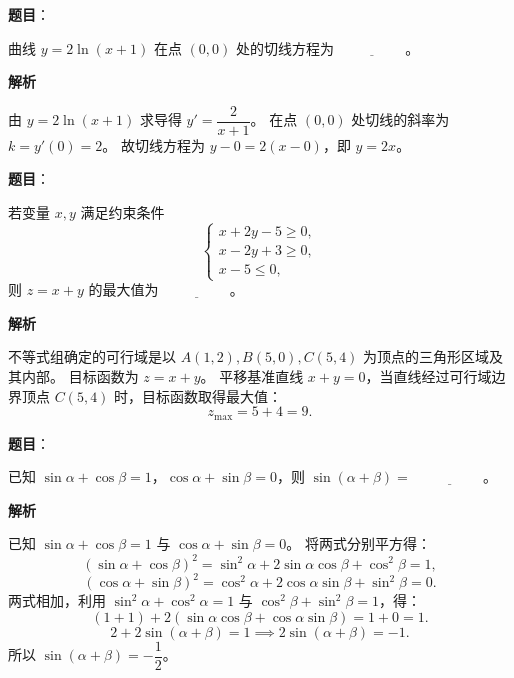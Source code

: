 \begin{answer}

\textbf{题目}：

曲线 $y=2\ln(x+1)$ 在点 $(0,0)$ 处的切线方程为 $\underline{\hspace{2cm}}$。

\textbf{解析}

由 $y=2\ln(x+1)$ 求导得 $y' = \dfrac{2}{x+1}$。
在点 $(0,0)$ 处切线的斜率为 $k = y'(0) = 2$。
故切线方程为 $y - 0 = 2(x - 0)$，即 $y = 2x$。


\end{answer}
\begin{answer}

\textbf{题目}：

若变量 $x, y$ 满足约束条件
\nopagebreak[4]
\[\begin{cases} x+2y-5\geqslant 0, \\ x-2y+3\geqslant 0, \\ x-5\leqslant 0, \end{cases}\]
则 $z=x+y$ 的最大值为 $\underline{\hspace{2cm}}$。

\textbf{解析}

不等式组确定的可行域是以 $A(1,2), B(5,0), C(5,4)$ 为顶点的三角形区域及其内部。
目标函数为 $z=x+y$。
平移基准直线 $x+y=0$，当直线经过可行域边界顶点 $C(5,4)$ 时，目标函数取得最大值：
\nopagebreak[4]
\[z_{\max} = 5 + 4 = 9.\]


\end{answer}
\begin{answer}

\textbf{题目}：

已知 $\sin\alpha+\cos\beta=1$，$\cos\alpha+\sin\beta=0$，则 $\sin(\alpha+\beta)=$ $\underline{\hspace{2cm}}$。

\textbf{解析}

已知 $\sin\alpha+\cos\beta=1$ 与 $\cos\alpha+\sin\beta=0$。
将两式分别平方得：
\nopagebreak[4]
\[(\sin\alpha+\cos\beta)^2 = \sin^2\alpha + 2\sin\alpha\cos\beta + \cos^2\beta = 1,\]
\nopagebreak[4]
\[(\cos\alpha+\sin\beta)^2 = \cos^2\alpha + 2\cos\alpha\sin\beta + \sin^2\beta = 0.\]
两式相加，利用 $\sin^2\alpha+\cos^2\alpha=1$ 与 $\cos^2\beta+\sin^2\beta=1$，得：
\nopagebreak[4]
\[(1+1) + 2(\sin\alpha\cos\beta+\cos\alpha\sin\beta) = 1+0 = 1.\]
\nopagebreak[4]
\[2 + 2\sin(\alpha+\beta) = 1 \implies 2\sin(\alpha+\beta) = -1.\]
所以 $\sin(\alpha+\beta) = -\dfrac12$。


\end{answer}
